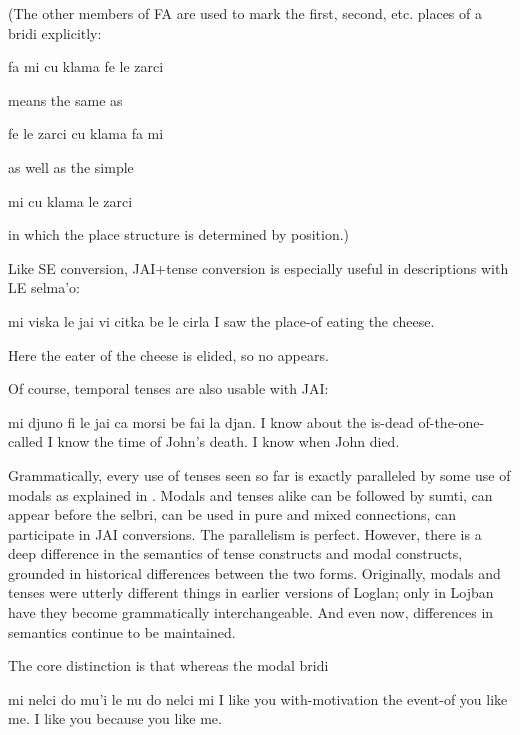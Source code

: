 (The other members of FA are used to mark the first, second,
    etc. places of a bridi explicitly:
\begin{example}
fa mi cu klama fe le zarci
\end{example}

{\noindent}means the same as
\begin{example}
fe le zarci cu klama fa mi
\end{example}

{\noindent}as well as the simple
\begin{example}
mi cu klama le zarci
\end{example}

{\noindent}in which the place structure is determined by position.) 

Like SE conversion, JAI+tense conversion is especially
    useful in descriptions with LE selma'o:
\begin{example}
mi viska le jai vi citka be le cirla\n
I saw the place-of eating the cheese.
\end{example}

Here the eater of the cheese is elided, so no 
    appears.

Of course, temporal tenses are also usable with JAI:
\begin{example}
mi djuno fi le jai ca morsi\n
\T	be fai la djan.\n
I know about the  is-dead\n
\T	of-the-one-called \n
I know the time of John's death.\n
I know when John died.
\end{example}



Grammatically, every use of tenses seen so far is exactly
    paralleled by some use of modals as explained in . Modals and tenses alike can be
    followed by sumti, can appear before the selbri, can be used in
    pure and mixed connections, can participate in JAI conversions.
    The parallelism is perfect. However, there is a deep difference
    in the semantics of tense constructs and modal constructs,
    grounded in historical differences between the two forms.
    Originally, modals and tenses were utterly different things in
    earlier versions of Loglan; only in Lojban have they become
    grammatically interchangeable. And even now, differences in
    semantics continue to be maintained.

The core distinction is that whereas the modal bridi
\begin{example}
mi nelci do mu'i le nu do nelci mi\n
I like you with-motivation the event-of you like me.\n
I like you because you like me.
\end{example}

